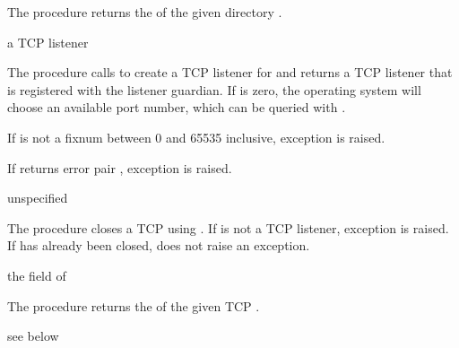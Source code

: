 The  procedure returns the
 of the given directory .

\begin{procedure}
\end{procedure}
\returns{} a TCP listener

The  procedure calls  to
create a TCP listener for  and returns a TCP listener
that is registered with the listener guardian. If  is zero, the operating system will
choose an available port number, which can be queried with
.

If  is not a fixnum between 0 and 65535 inclusive,
exception  is raised.

If  returns error pair , exception  is raised.

\begin{procedure}
\end{procedure}
\returns{} unspecified

The  procedure closes a TCP
 using
.  If  is not a TCP
listener, exception  is raised. If  has already been
closed,  does not raise an exception.

\begin{procedure}
\end{procedure}
\returns{} the  field of 

The  procedure returns the
 of the given TCP .

\begin{procedure}
\end{procedure}
\returns{} see below

